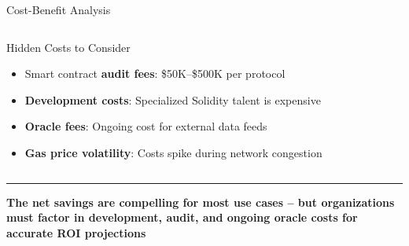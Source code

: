 \documentclass[8pt,aspectratio=169]{beamer}
\newcommand{\bottomnote}[1]{\vfill\vspace{-2mm}\textcolor{mllavender2}{\rule{\textwidth}{0.4pt}}\vspace{1mm}\footnotesize\textbf{#1}}
\begin{document}
\begin{frame}{Cost-Benefit Analysis}
\begin{columns}[T]
\begin{alertblock}{Hidden Costs to Consider}
\begin{itemize}
  \item Smart contract \textbf{audit fees}: \$50K--\$500K per protocol
  \item \textbf{Development costs}: Specialized Solidity talent is expensive
  \item \textbf{Oracle fees}: Ongoing cost for external data feeds
  \item \textbf{Gas price volatility}: Costs spike during network congestion
\end{itemize}
\end{alertblock}
\end{columns}
\bottomnote{The net savings are compelling for most use cases -- but organizations must factor in development, audit, and ongoing oracle costs for accurate ROI projections}
\end{frame}
\end{document}
